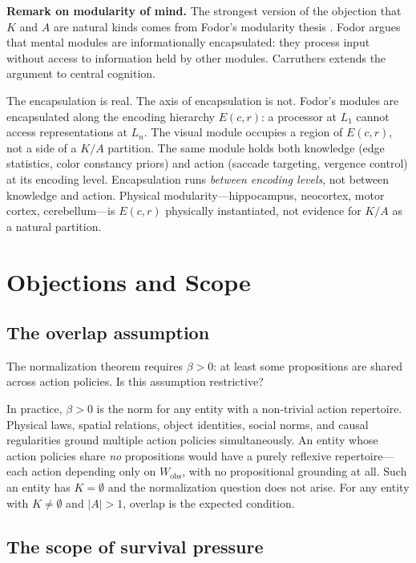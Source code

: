 \documentclass[11pt]{article}
\theoremstyle{definition}
\theoremstyle{remark}
\begin{document}
\textbf{Remark on modularity of mind.} The strongest version of the
objection that $K$ and $A$ are natural kinds comes from Fodor's
modularity thesis \cite{Fodor1983}. Fodor argues that mental modules
are informationally encapsulated: they process input without access to
information held by other modules. Carruthers \cite{Carruthers2006}
extends the argument to central cognition.

The encapsulation is real. The axis of encapsulation is not. Fodor's
modules are encapsulated along the encoding hierarchy $E(c,r)$: a
processor at $L_1$ cannot access representations at $L_n$. The visual
module occupies a region of $E(c,r)$, not a side of a $K/A$ partition.
The same module holds both knowledge (edge statistics, color constancy
priors) and action (saccade targeting, vergence control) at its encoding
level. Encapsulation runs \emph{between encoding levels}, not between
knowledge and action. Physical modularity---hippocampus, neocortex,
motor cortex, cerebellum---is $E(c,r)$ physically instantiated, not
evidence for $K/A$ as a natural partition.

\section{Objections and Scope}
\label{sec:objections}

\subsection{The overlap assumption}

The normalization theorem requires $\beta > 0$: at least some
propositions are shared across action policies. Is this assumption
restrictive?

In practice, $\beta > 0$ is the norm for any entity with a
non-trivial action repertoire. Physical laws, spatial relations,
object identities, social norms, and causal regularities ground
multiple action policies simultaneously. An entity whose action
policies share \emph{no} propositions would have a purely reflexive
repertoire---each action depending only on $W_{\text{obs}}$, with
no propositional grounding at all. Such an entity has $K = \emptyset$
and the normalization question does not arise. For any entity with
$K \neq \emptyset$ and $|A| > 1$, overlap is the expected condition.

\subsection{The scope of survival pressure}
\end{document}
